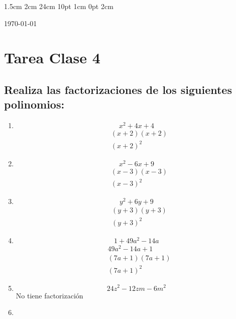 \documentclass[12pt,letterpaper]{report}
\begin{document}
\setmargins{2.5cm}      
{1.5cm}                     
{2cm}  
{24cm}                    
{10pt}                          
{1cm}                          
{0pt}                             
{2cm}
\begin{flushright}
\today
\end{flushright}
\vspace{-1.75cm}
\section*{Tarea Clase 4}
\subsection*{Realiza las factorizaciones de los siguientes polinomios:}
\begin{enumerate}
\item \begin{equation*}
    x^2+4x+4
\end{equation*}
\begin{align*}
    &(x+2)(x+2)\\
    &(x+2)^2
\end{align*}
\item \begin{equation*}
    x^2-6x+9
\end{equation*}
\begin{align*}
    &(x-3)(x-3)\\
    &(x-3)^2
\end{align*}
\item \begin{equation*}
    y^2+6y+9
\end{equation*}
\begin{align*}
    &(y+3)(y+3)\\
    &(y+3)^2
\end{align*}
\item \begin{equation*}
1+49a^2-14a    
\end{equation*}
\begin{align*}
    &49a^2-14a+1\\
    &(7a+1)(7a+1)\\
    &(7a+1)^2
\end{align*}
\item \begin{equation*}
24z^2-12zm-6m^2
\end{equation*}
No tiene factorización
\item \begin{equation*}

\end{equation*}
\end{enumerate}
\end{document}

